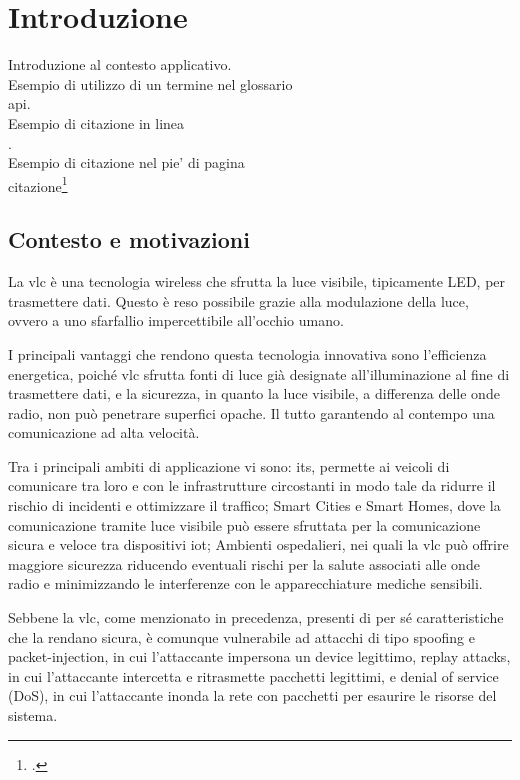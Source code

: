 \chapter{Introduzione}
\label{cap:introduzione}

Introduzione al contesto applicativo.\\

\noindent Esempio di utilizzo di un termine nel glossario \\
\gls{api}. \\

\noindent Esempio di citazione in linea \\
\cite{site:agile-manifesto}. \\

\noindent Esempio di citazione nel pie' di pagina \\
citazione\footcite{womak:lean-thinking} \\

\section{Contesto e motivazioni}
La \gls{vlc} è una tecnologia wireless che sfrutta la luce visibile, tipicamente LED, per trasmettere dati. Questo è reso possibile grazie alla modulazione della luce, ovvero a uno sfarfallio impercettibile all'occhio umano.

I principali vantaggi che rendono questa tecnologia innovativa sono l'efficienza energetica, poiché \gls{vlc} sfrutta fonti di luce già designate all'illuminazione al fine di trasmettere dati, e la sicurezza, in quanto la luce visibile, a differenza delle onde radio, non può penetrare superfici opache. Il tutto garantendo al contempo una comunicazione ad alta velocità.

Tra i principali ambiti di applicazione vi sono: \gls{its}, permette ai veicoli di comunicare tra loro e con le infrastrutture circostanti in modo tale da ridurre il rischio di incidenti e ottimizzare il traffico; Smart Cities e Smart Homes, dove la comunicazione tramite luce visibile può essere sfruttata per la comunicazione sicura e veloce tra dispositivi \gls{iot}; Ambienti ospedalieri, nei quali la \gls{vlc} può offrire maggiore sicurezza riducendo eventuali rischi per la salute associati alle onde radio e minimizzando le interferenze con le apparecchiature mediche sensibili.

Sebbene la \gls{vlc}, come menzionato in precedenza, presenti di per sé caratteristiche che la rendano sicura, è comunque vulnerabile ad attacchi di tipo spoofing e packet-injection, in cui l'attaccante impersona un device legittimo, replay attacks, in cui l'attaccante intercetta e ritrasmette pacchetti legittimi, e denial of service (DoS), in cui l'attaccante inonda la rete con pacchetti per esaurire le risorse del sistema.

